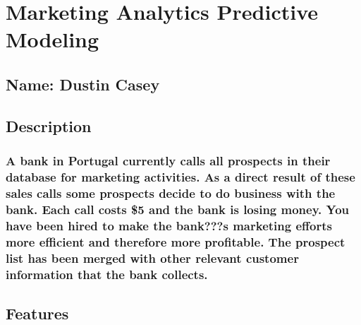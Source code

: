 \documentclass[
]{article}
\author{}
\date{\vspace{-2.5em}}
\begin{document}
\hypertarget{marketing-analytics-predictive-modeling}{%
\section{Marketing Analytics Predictive
Modeling}\label{marketing-analytics-predictive-modeling}}

\hypertarget{name-dustin-casey}{%
\subsection{Name: Dustin Casey}\label{name-dustin-casey}}

\hypertarget{description}{%
\subsection{Description}\label{description}}

\hypertarget{a-bank-in-portugal-currently-calls-all-prospects-in-their-database-for-marketing-activities.-as-a-direct-result-of-these-sales-calls-some-prospects-decide-to-do-business-with-the-bank.-each-call-costs-5-and-the-bank-is-losing-money.-you-have-been-hired-to-make-the-banks-marketing-efforts-more-efficient-and-therefore-more-profitable.-the-prospect-list-has-been-merged-with-other-relevant-customer-information-that-the-bank-collects.}{%
\subsubsection{A bank in Portugal currently calls all prospects in their
database for marketing activities. As a direct result of these sales
calls some prospects decide to do business with the bank. Each call
costs \$5 and the bank is losing money. You have been hired to make the
bank???s marketing efforts more efficient and therefore more profitable.
The prospect list has been merged with other relevant customer
information that the bank
collects.}\label{a-bank-in-portugal-currently-calls-all-prospects-in-their-database-for-marketing-activities.-as-a-direct-result-of-these-sales-calls-some-prospects-decide-to-do-business-with-the-bank.-each-call-costs-5-and-the-bank-is-losing-money.-you-have-been-hired-to-make-the-banks-marketing-efforts-more-efficient-and-therefore-more-profitable.-the-prospect-list-has-been-merged-with-other-relevant-customer-information-that-the-bank-collects.}}

\hypertarget{features}{%
\subsection{Features}\label{features}}
\end{document}

